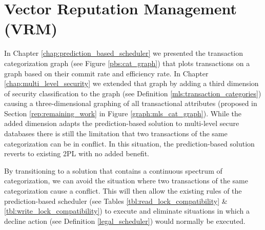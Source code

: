 \section{Vector Reputation Management (VRM)}
\label{rep:vrm}

In Chapter \ref{chap:prediction_based_scheduler} we presented the transaction categorization graph (see Figure \ref{pbs:cat_graph}) that plots transactions on a graph based on their commit rate and efficiency rate. In Chapter \ref{chap:multi_level_security} we extended that graph by adding a third dimension of security classification to the graph (see Definition \ref{mls:transaction_categories}) causing a three-dimensional graphing of all transactional attributes (proposed in Section \ref{rep:remaining_work} in Figure \ref{graph:mls_cat_graph}). While the added dimension adapts the prediction-based solution to multi-level secure databases there is still the limitation that two transactions of the same categorization can be in conflict. In this situation, the prediction-based solution reverts to existing 2PL with no added benefit.

By transitioning to a solution that contains a continuous spectrum of categorization, we can avoid the situation where two transactions of the same categorization cause a conflict. This will then allow the existing rules of the prediction-based scheduler (see Tables \ref{tbl:read_lock_compatibility} \& \ref{tbl:write_lock_compatibility}) to execute and eliminate situations in which a decline action (see Definition \ref{legal_scheduler}) would normally be executed.